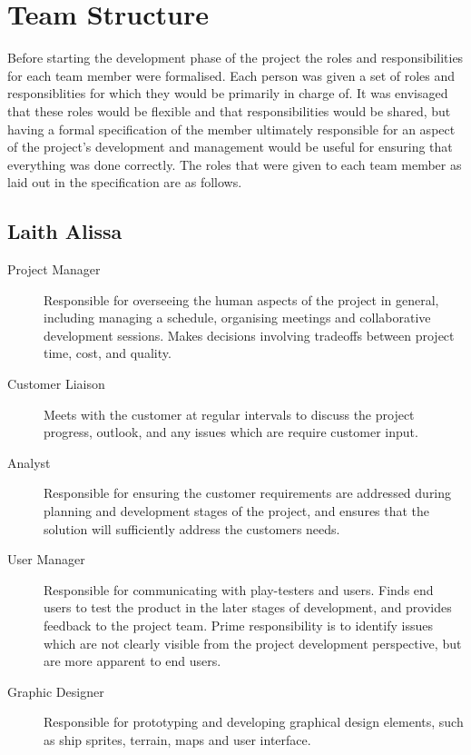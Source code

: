 \section{Team Structure}

Before starting the development phase of the project the roles and responsibilities for
each team member were formalised. Each person was given a set of roles and responsiblities
for which they would be primarily in charge of. It was envisaged that these roles would
be flexible and that responsibilities would be shared, but having a formal specification
of the member ultimately responsible for an aspect of the project's development and management
would be useful for ensuring that everything was done correctly. The roles that were given
to each team member as laid out in the specification are as follows.

\subsection{Laith Alissa}
\begin{description}
    \item[Project Manager] Responsible for overseeing the human aspects of the project in general, including managing a schedule, organising meetings and collaborative development sessions. Makes decisions involving tradeoffs between project time, cost, and quality.
    \item[Customer Liaison] Meets with the customer at regular intervals to discuss the project progress, outlook, and any issues which are require customer input. 
    \item[Analyst] Responsible for ensuring the customer requirements are addressed during planning and development stages of the project, and ensures that the solution will sufficiently address the customers needs.
    \item[User Manager] Responsible for communicating with play-testers and users. Finds end users to test the product in the later stages of development, and provides feedback to the project team. Prime responsibility is to identify issues which are not clearly visible from the project development perspective, but are more apparent to end users. 
    \item[Graphic Designer] Responsible for prototyping and developing graphical design elements, such as ship sprites, terrain, maps and user interface.   
\end{description}

